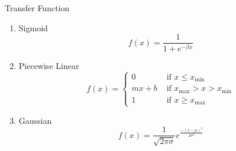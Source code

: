 \documentclass{beamer}
\begin{document}
\begin{frame}{Transfer Function}
    \begin{enumerate}
        \item Sigmoid
            \begin{equation}
                f(x)=\frac{1}{1+e^{-\beta x}}
            \end{equation}
        \item Piecewise Linear
            \begin{equation}
                f(x)=\left\{\begin{array}{ll}0 & \text { if } x \leq x_{\min }
                        \\ m x+b & \text { if } x_{\max }>x>x_{\min } \\ 1 &
                    \text { if } x \geq x_{\max }\end{array}\right.
                    \end{equation}
        \item Gaussian
            \begin{equation}
                f(x)=\frac{1}{\sqrt{2 \pi \sigma}} e^{\frac{-(x-\mu)^{2}}{2
                \sigma^{2}}}
            \end{equation}

    \end{enumerate}
\end{frame}
\end{document}

